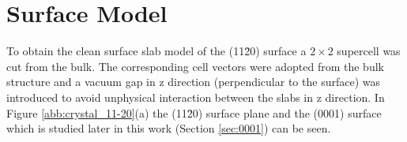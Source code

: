 \documentclass[11pt,DIV=13,BCOR=5mm,a4paper,headinclude]{scrbook}
\begin{document}
\section{Surface Model}
To obtain the clean surface slab model of the (11\=20) surface a $2\times 2$ supercell was cut from the bulk.
The corresponding cell vectors were adopted from the bulk structure and a vacuum gap in z direction (perpendicular to the surface) was introduced to avoid unphysical interaction between the slabs in z direction.
In Figure \ref{abb:crystal_11-20}(a) the (11\=20) surface plane and the (0001) surface which is studied later in this work (Section \ref{sec:0001}) can be seen.
\begin{figure}[!h]
    \centering
             \quad
             \quad

\end{figure}
\end{document}
